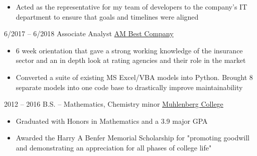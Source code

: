 \documentclass[9pt]{developercv} %
\begin{document}
\begin{entrylist}
{\begin{itemize}[leftmargin=*]
				\item Acted as the representative for my team of developers to the company's IT department to ensure that goals and timelines were aligned
		\end{itemize}
	\vspace{-5pt}}
	\entry
		{\small6/2017 -- 6/2018}
		{Associate Analyst}
		{\href{http://www.ambest.com/home/default.aspx}{AM Best Company}}
		{\vspace{-18pt}
			\begin{itemize}[leftmargin=*]
				\setlength{\itemsep}{0pt}
				\setlength{\parskip}{0pt}
				\setlength{\parsep}{0pt}
				\item 6 week orientation that gave a strong working knowledge of the insurance sector and an in depth look at rating agencies and their role in the market
				\item Converted a suite of existing MS Excel/VBA models into Python. Brought 8 separate models into one code base to drastically improve maintainability
		\end{itemize}}
\end{entrylist}


\vspace{-0.5cm}


\begin{entrylist}
	\entry
		{\small2012 -- 2016}
		{B.S. -- Mathematics, Chemistry minor}
		{\href{https://www.muhlenberg.edu/}{Muhlenberg College}}
		{\vspace{-18pt}
			\begin{itemize}[leftmargin=*]
				\setlength{\itemsep}{0pt}
				\setlength{\parskip}{0pt}
				\setlength{\parsep}{0pt}
				\item Graduated with Honors in Mathematics and a 3.9 major GPA
				\item Awarded the Harry A Benfer Memorial Scholarship for "promoting goodwill and demonstrating an appreciation for all phases of college life"
		\end{itemize}}
\end{entrylist}
\end{document}
